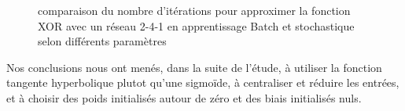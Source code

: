 \documentclass[
    10pt,
    a4paper,
    oneside,
    headinclude,footinclude,
    BCOR=5mm,
    captions=tableabove
]{scrartcl}
\begin{document}
\begin{figure}[H]
\centering
{}
\hspace{1mm}
\vspace{2mm}
\hspace{1mm}

\caption{comparaison du nombre d'itérations pour approximer la fonction XOR avec un réseau 2-4-1 en apprentissage Batch et stochastique selon différents paramètres}
\end{figure}

Nos conclusions nous ont menés, dans la suite de l'étude, à utiliser la fonction tangente hyperbolique plutot qu'une sigmoïde, à centraliser et réduire les entrées, et à choisir des poids initialisés autour de zéro et des biais initialisés nuls.
\end{document}

